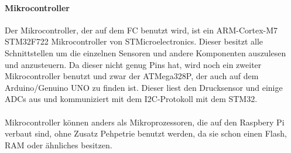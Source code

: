\documentclass[12pt,a4paper, ngerman]{article}
\begin{document}
\paragraph{Mikrocontroller}
Der Mikrocontroller, der auf dem FC benutzt wird, ist ein ARM-Cortex-M7 STM32F722 Mikrocontroller von STMicroelectronics. Dieser besitzt alle Schnittstellen um die einzelnen Sensoren und andere Komponenten auszulesen und anzusteuern. Da dieser nicht genug Pins hat, wird noch ein zweiter Mikrocontroller benutzt und zwar der ATMega328P, der auch auf dem Arduino/Genuino UNO zu finden ist. Dieser liest den Drucksensor und einige ADCs aus und kommuniziert mit dem I2C-Protokoll mit dem STM32. \\ \\
Mikrocontroller können anders als Mikroprozessoren, die auf den Raspbery Pi verbaut sind, ohne Zusatz Pehpetrie benutzt werden, da sie schon einen Flash, RAM oder ähnliches besitzen. 
\end{document}
